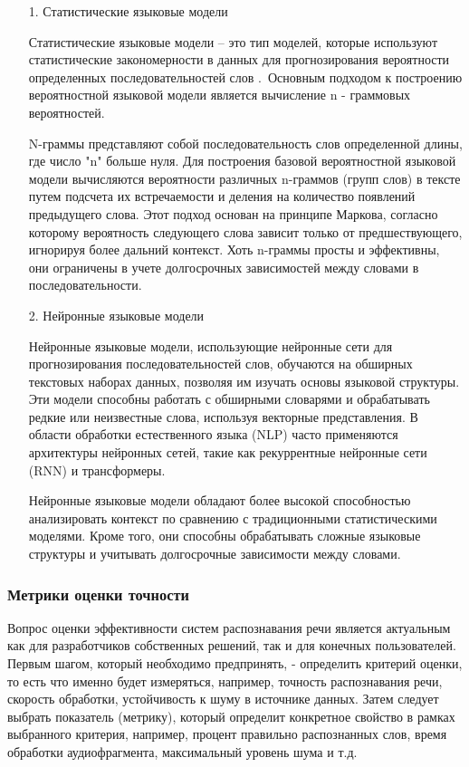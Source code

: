 \begin{itemize}[parsep=0.4em]
    \setlength\itemsep{0.8em plus 0.2em minus 0.2em}
    \item[1.] Статистические языковые модели
    
        Статистические языковые модели – это тип моделей, которые используют статистические закономерности в данных для прогнозирования вероятности определенных последовательностей слов \cite{bib:LM:1}. Основным подходом к построению вероятностной языковой модели является вычисление n - граммовых вероятностей.

        N-граммы представляют собой последовательность слов определенной длины, где число "n" больше нуля. Для построения базовой вероятностной языковой модели вычисляются вероятности различных n-граммов (групп слов) в тексте путем подсчета их встречаемости и деления на количество появлений предыдущего слова. Этот подход основан на принципе Маркова, согласно которому вероятность следующего слова зависит только от предшествующего, игнорируя более дальний контекст. Хоть n-граммы просты и эффективны, они ограничены в учете долгосрочных зависимостей между словами в последовательности.

    \item[2.] Нейронные языковые модели

        Нейронные языковые модели, использующие нейронные сети для прогнозирования последовательностей слов, обучаются на обширных текстовых наборах данных, позволяя им изучать основы языковой структуры. Эти модели способны работать с обширными словарями и обрабатывать редкие или неизвестные слова, используя векторные представления. В области обработки естественного языка (NLP) часто применяются архитектуры нейронных сетей, такие как рекуррентные нейронные сети (RNN) и трансформеры.

        Нейронные языковые модели обладают более высокой способностью анализировать контекст по сравнению с традиционными статистическими моделями. Кроме того, они способны обрабатывать сложные языковые структуры и учитывать долгосрочные зависимости между словами.

\end{itemize}

\subsubsection{Метрики оценки точности}

Вопрос оценки эффективности систем распознавания речи является актуальным как для разработчиков собственных решений, так и для конечных пользователей. Первым шагом, который необходимо предпринять, - определить критерий оценки, то есть что именно будет измеряться, например, точность распознавания речи, скорость обработки, устойчивость к шуму в источнике данных. Затем следует выбрать показатель (метрику), который определит конкретное свойство в рамках выбранного критерия, например, процент правильно распознанных слов, время обработки аудиофрагмента, максимальный уровень шума и т.д.

